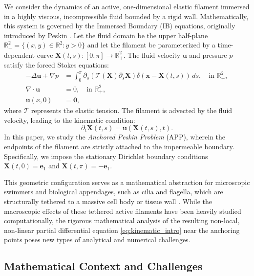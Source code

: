\documentclass{amsart}
\begin{document}
We consider the dynamics of an active, one-dimensional elastic filament immersed in a highly viscous, incompressible fluid bounded by a rigid wall. Mathematically, this system is governed by the Immersed Boundary (IB) equations, originally introduced by Peskin \cite{peskin1972flow}. Let the fluid domain be the upper half-plane $\mathbb{R}^2_+ = \{ (x,y) \in \mathbb{R}^2 : y > 0 \}$ and let the filament be parameterized by a time-dependent curve $\mathbf{X}(t,s) : [0,\pi] \to \mathbb{R}^2_+$. The fluid velocity $\mathbf{u}$ and pressure $p$ satisfy the forced Stokes equations:
\[
\begin{aligned}
    -\Delta \mathbf{u} + \nabla p &= \int_0^\pi \partial_s \left( \mathcal{T}(\mathbf{X}) \partial_s \mathbf{X} \right) \delta(\mathbf{x} - \mathbf{X}(t,s)) \, ds, \quad \text{in } \mathbb{R}^2_+, \\
    \nabla \cdot \mathbf{u} &= 0, \quad \text{in } \mathbb{R}^2_+, \\
    \mathbf{u}(x, 0) &= \mathbf{0},
\end{aligned}
\]
where $\mathcal{T}$ represents the elastic tension. The filament is advected by the fluid velocity, leading to the kinematic condition:
\begin{equation}\label{eq:kinematic_intro}
    \partial_t \mathbf{X}(t,s) = \mathbf{u}(\mathbf{X}(t,s), t).
\end{equation}
In this paper, we study the \emph{Anchored Peskin Problem} (APP), wherein the endpoints of the filament are strictly attached to the impermeable boundary. Specifically, we impose the stationary Dirichlet boundary conditions $\mathbf{X}(t,0) = \mathbf{e}_1$ and $\mathbf{X}(t,\pi) = -\mathbf{e}_1$.

This geometric configuration serves as a mathematical abstraction for microscopic swimmers and biological appendages, such as cilia and flagella, which are structurally tethered to a massive cell body or tissue wall \cite{dillon1995microscale, fauci1995sperm, lauga2009hydrodynamics}. While the macroscopic effects of these tethered active filaments have been heavily studied computationally, the rigorous mathematical analysis of the resulting non-local, non-linear partial differential equation \eqref{eq:kinematic_intro} near the anchoring points poses new types of analytical and numerical challenges.
\subsection{Mathematical Context and Challenges}
\end{document}
